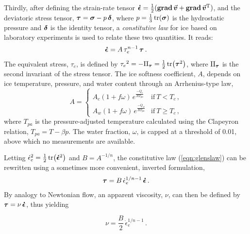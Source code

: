 \documentclass{article}
\newcommand{\vect}[1]{\va*{#1}} %
\newcommand{\tens}[1]{\vb*{#1}} %
\newcommand{\tgrad}[1]{\tens{\mathrm{grad}}\,#1}    %
\newcommand{\doteps}[0]{\dot{\epsilon}} %
\newcommand{\IDT}[0]{\tens{\delta}}     %
\newcommand{\CST}[0]{\tens{\sigma}}     %
\newcommand{\DST}[0]{\tens{\tau}}       %
\newcommand{\SRT}[0]{\tens{\doteps}}    %
\newcommand{\vv}[0]{\vect{v}}           %
\begin{document}
Thirdly, after defining the strain-rate tensor
${\SRT = \frac{1}{2}(\tgrad{\vv} + \tgrad{\vv}^{\mathrm{T}})}$,
and the deviatoric stress tensor, ${\DST = \CST - p\,\IDT}$,
where $p=\frac{1}{3}\tr(\CST)$ is the hydrostatic pressure and
$\tens{\delta}$ is the identity tensor, a \emph{constitutive law} for ice based
on laboratory experiments is used to relate these two quantities. It reads:
\begin{equation}
    \label{eqn:glenslaw}
    \SRT = A\,\tau_e^{n-1}\,\DST \,.
\end{equation}
The equivalent stress, $\tau_e$, is defined by
${\tau_e}^2 = -\mathrm{II}_{\DST} = \frac{1}{2} \tr(\DST^2)$,
where $\mathrm{II}_{\DST}$ is the second invariant of the stress tensor.
The ice softness coefficient, $A$, depends on ice temperature, pressure, and
water content through an Arrhenius-type law,
\begin{equation}
    A =
    \begin{cases}
        A_c (1+f\omega)\,e^\frac{-Q_c}{RT_{pa}}
            & \text{if}\ T < T_c \,, \\
        A_w (1+f\omega)\,e^\frac{-Q_w}{RT_{pa}}
            & \text{if}\ T \ge T_c \,,
    \end{cases}
\end{equation}
where $T_{pa}$ is the pressure-adjusted temperature calculated using the
Clapeyron relation, ${T_{pa} = T - \beta p}$. The water fraction, $\omega$, is
capped at a threshold of 0.01, above which no measurements are available.

Letting ${\doteps_e}^2 = \frac{1}{2} \tr(\SRT^2)$ and $B=A^{-1/n}$, the
constitutive law (\ref{eqn:glenslaw}) can be rewritten using a sometimes more
convenient, inverted formulation,
\begin{equation}
    \label{eqn:invglenslaw}
    \DST = B\,\doteps_e^{1/n-1}\,\SRT \,.
\end{equation}
By analogy to Newtonian flow, an apparent viscosity, $\nu$, can then be defined
by $\DST = \nu\,\SRT$, thus yielding

\begin{equation}
    \label{eqn:viscosity}
    \nu = \frac{B}{2}\,\doteps_e^{1/n-1} \,.
\end{equation}
\end{document}
